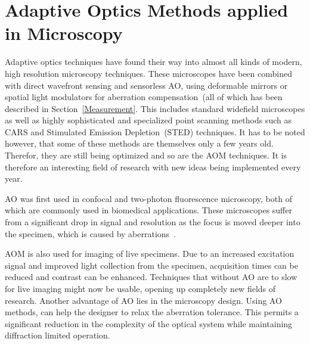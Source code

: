 
\section{Adaptive Optics Methods applied in Microscopy}
\label{sec:ExperimentDiscussion}

Adaptive optics techniques have found their way into almost all kinds of modern, high resolution microscopy techniques. These microscopes have been combined with direct wavefront sensing and sensorless AO, using deformable mirrors or spatial light modulators for aberration compensation~(all of which has been described in Section~\ref{Measurement}. This includes standard widefield microscopes as well as highly sophisticated and specialized point scanning methods such as CARS and Stimulated Emission Depletion~(STED) techniques. It has to be noted however, that some of these methods are themselves only a few years old. Therefor, they are still being optimized and so are the AOM techniques. It is therefore an interesting field of research with new ideas being implemented every year.

AO was first used in confocal and two-photon fluorescence microscopy, both of which are commonly used in biomedical applications. These microscopes suffer from a significant drop in signal and resolution as the focus is moved deeper into the specimen, which is caused by aberrations~\cite{characterizing_abberations}.

AOM is also used for imaging of live specimens. Due to an increased excitation signal and improved light collection from the specimen, acquisition times can be reduced and contrast can be enhanced. Techniques that without AO are to slow for live imaging might now be usable, opening up completely new fields of research. Another advantage of AO lies in the microscopy design. Using AO methods, can help the designer to relax the aberration tolerance. This permits a significant reduction in the complexity of the optical system while maintaining diffraction limited operation.

